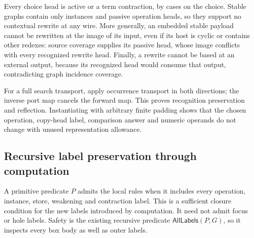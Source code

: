 

Every choice head is active or a term contraction, by cases on the choice.
Stable graphs contain only instances and passive operation heads, so they
support no contextual rewrite at any wire. More generally, an embedded
stable payload cannot be rewritten at the image of its input, even if its
host is cyclic or contains other redexes: source coverage supplies its passive
head, whose image conflicts with every recognized rewrite head. Finally, a
rewrite cannot be based at an external output, because its recognized head
would consume that output, contradicting graph incidence coverage.





For a full search transport, apply occurrence transport in both directions;
the inverse port map cancels the forward map. This proves recognition
preservation and reflection. Instantiating with arbitrary finite padding
shows that the chosen operation, copy-head label, comparison answer and
numeric operands do not change with unused representation allowance.



\subsection{Recursive label preservation through computation}

A primitive predicate $P$ admits the local rules when it includes every
operation, instance, store, weakening and contraction label. This is a
sufficient closure condition for the new labels introduced by computation.
It need not admit focus or hole labels. Safety is the existing recursive
predicate $\mathsf{AllLabels}(P,G)$, so it inspects every box body as well as
outer labels.


